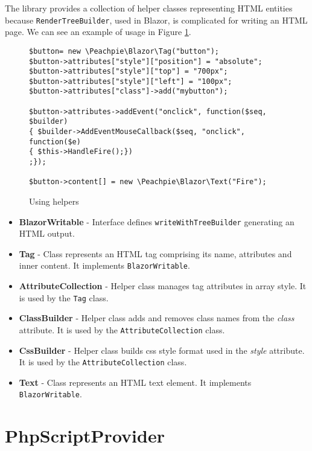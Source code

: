 The library provides a collection of helper classes representing HTML entities because \texttt{RenderTreeBuilder}, used in Blazor, is complicated for writing an HTML page. We can see an example of usage in Figure \ref{img36:helpers}.
\par
\begin{figure}[H]
\begin{lstlisting}
$button= new \Peachpie\Blazor\Tag("button");
$button->attributes["style"]["position"] = "absolute";
$button->attributes["style"]["top"] = "700px";
$button->attributes["style"]["left"] = "100px";
$button->attributes["class"]->add("mybutton");        
        
$button->attributes->addEvent("onclick", function($seq, $builder) 
{ $builder->AddEventMouseCallback($seq, "onclick", function($e) 
{ $this->HandleFire();})
;});
        
$button->content[] = new \Peachpie\Blazor\Text("Fire");
\end{lstlisting}
\caption{Using helpers}
\label{img36:helpers}
\end{figure}
\par
\begin{itemize}
\item \textbf{BlazorWritable} - Interface defines \texttt{writeWithTreeBuilder} generating an HTML output. 
\item \textbf{Tag} - Class represents an HTML tag comprising its name, attributes and inner content. It implements \texttt{BlazorWritable}.  
\item \textbf{AttributeCollection} - Helper class manages tag attributes in array style. It is used by the \texttt{Tag} class.
\item \textbf{ClassBuilder} - Helper class adds and removes class names from the \textit{class} attribute. It is used by the \texttt{AttributeCollection} class.  
\item \textbf{CssBuilder} - Helper class builds css style format used in the \textit{style} attribute. It is used by the \texttt{AttributeCollection} class.  
\item \textbf{Text} - Class represents an HTML text element. It implements \\ \texttt{BlazorWritable}.  
\end{itemize}
\par

\section{PhpScriptProvider}


